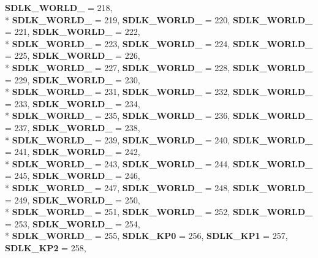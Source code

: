 \begin{DoxyCompactItemize}
{\bf S\+D\+L\+K\+\_\+\+W\+O\+R\+L\+D\+\_} = 218, 
\\*
{\bf S\+D\+L\+K\+\_\+\+W\+O\+R\+L\+D\+\_} = 219, 
{\bf S\+D\+L\+K\+\_\+\+W\+O\+R\+L\+D\+\_} = 220, 
{\bf S\+D\+L\+K\+\_\+\+W\+O\+R\+L\+D\+\_} = 221, 
{\bf S\+D\+L\+K\+\_\+\+W\+O\+R\+L\+D\+\_} = 222, 
\\*
{\bf S\+D\+L\+K\+\_\+\+W\+O\+R\+L\+D\+\_} = 223, 
{\bf S\+D\+L\+K\+\_\+\+W\+O\+R\+L\+D\+\_} = 224, 
{\bf S\+D\+L\+K\+\_\+\+W\+O\+R\+L\+D\+\_} = 225, 
{\bf S\+D\+L\+K\+\_\+\+W\+O\+R\+L\+D\+\_} = 226, 
\\*
{\bf S\+D\+L\+K\+\_\+\+W\+O\+R\+L\+D\+\_} = 227, 
{\bf S\+D\+L\+K\+\_\+\+W\+O\+R\+L\+D\+\_} = 228, 
{\bf S\+D\+L\+K\+\_\+\+W\+O\+R\+L\+D\+\_} = 229, 
{\bf S\+D\+L\+K\+\_\+\+W\+O\+R\+L\+D\+\_} = 230, 
\\*
{\bf S\+D\+L\+K\+\_\+\+W\+O\+R\+L\+D\+\_} = 231, 
{\bf S\+D\+L\+K\+\_\+\+W\+O\+R\+L\+D\+\_} = 232, 
{\bf S\+D\+L\+K\+\_\+\+W\+O\+R\+L\+D\+\_} = 233, 
{\bf S\+D\+L\+K\+\_\+\+W\+O\+R\+L\+D\+\_} = 234, 
\\*
{\bf S\+D\+L\+K\+\_\+\+W\+O\+R\+L\+D\+\_} = 235, 
{\bf S\+D\+L\+K\+\_\+\+W\+O\+R\+L\+D\+\_} = 236, 
{\bf S\+D\+L\+K\+\_\+\+W\+O\+R\+L\+D\+\_} = 237, 
{\bf S\+D\+L\+K\+\_\+\+W\+O\+R\+L\+D\+\_} = 238, 
\\*
{\bf S\+D\+L\+K\+\_\+\+W\+O\+R\+L\+D\+\_} = 239, 
{\bf S\+D\+L\+K\+\_\+\+W\+O\+R\+L\+D\+\_} = 240, 
{\bf S\+D\+L\+K\+\_\+\+W\+O\+R\+L\+D\+\_} = 241, 
{\bf S\+D\+L\+K\+\_\+\+W\+O\+R\+L\+D\+\_} = 242, 
\\*
{\bf S\+D\+L\+K\+\_\+\+W\+O\+R\+L\+D\+\_} = 243, 
{\bf S\+D\+L\+K\+\_\+\+W\+O\+R\+L\+D\+\_} = 244, 
{\bf S\+D\+L\+K\+\_\+\+W\+O\+R\+L\+D\+\_} = 245, 
{\bf S\+D\+L\+K\+\_\+\+W\+O\+R\+L\+D\+\_} = 246, 
\\*
{\bf S\+D\+L\+K\+\_\+\+W\+O\+R\+L\+D\+\_} = 247, 
{\bf S\+D\+L\+K\+\_\+\+W\+O\+R\+L\+D\+\_} = 248, 
{\bf S\+D\+L\+K\+\_\+\+W\+O\+R\+L\+D\+\_} = 249, 
{\bf S\+D\+L\+K\+\_\+\+W\+O\+R\+L\+D\+\_} = 250, 
\\*
{\bf S\+D\+L\+K\+\_\+\+W\+O\+R\+L\+D\+\_} = 251, 
{\bf S\+D\+L\+K\+\_\+\+W\+O\+R\+L\+D\+\_} = 252, 
{\bf S\+D\+L\+K\+\_\+\+W\+O\+R\+L\+D\+\_} = 253, 
{\bf S\+D\+L\+K\+\_\+\+W\+O\+R\+L\+D\+\_} = 254, 
\\*
{\bf S\+D\+L\+K\+\_\+\+W\+O\+R\+L\+D\+\_} = 255, 
{\bf S\+D\+L\+K\+\_\+\+K\+P0} = 256, 
{\bf S\+D\+L\+K\+\_\+\+K\+P1} = 257, 
{\bf S\+D\+L\+K\+\_\+\+K\+P2} = 258, 

\end{DoxyCompactItemize}
